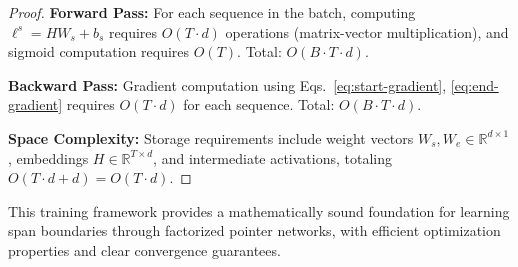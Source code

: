 \begin{proof}
	\textbf{Forward Pass:} For each sequence in the batch, computing \(\ell^s = H W_s + b_s\) requires \(O(T \cdot d)\) operations (matrix-vector multiplication), and sigmoid computation requires \(O(T)\). Total: \(O(B \cdot T \cdot d)\).
	
	\textbf{Backward Pass:} Gradient computation using Eqs.~\eqref{eq:start-gradient}, \eqref{eq:end-gradient} requires \(O(T \cdot d)\) for each sequence. Total: \(O(B \cdot T \cdot d)\).
	
	\textbf{Space Complexity:} Storage requirements include weight vectors \(W_s, W_e \in \mathbb{R}^{d \times 1}\), embeddings \(H \in \mathbb{R}^{T \times d}\), and intermediate activations, totaling \(O(T \cdot d + d) = O(T \cdot d)\).
\end{proof}

This training framework provides a mathematically sound foundation for learning span boundaries through factorized pointer networks, with efficient optimization properties and clear convergence guarantees.
